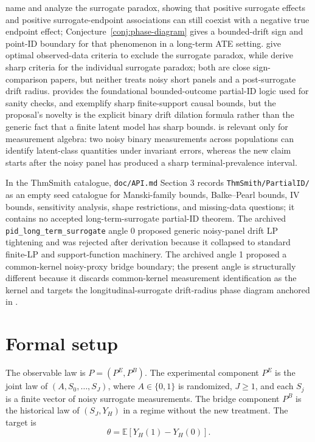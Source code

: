 \documentclass[11pt]{article}
\newcommand{\E}{\mathbb{E}}
\theoremstyle{definition}
\theoremstyle{plain}
\theoremstyle{remark}
\begin{document}
\citet{ChenGengJia2007} name and analyze the surrogate paradox, showing that positive surrogate effects and positive surrogate-endpoint associations can still coexist with a negative true endpoint effect; Conjecture~\ref{conj:phase-diagram} gives a bounded-drift sign and point-ID boundary for that phenomenon in a long-term ATE setting.  \citet{YinLiuGengLuo2020} give optimal observed-data criteria to exclude the surrogate paradox, while \citet{MaYinLiuGeng2021} derive sharp criteria for the individual surrogate paradox; both are close sign-comparison papers, but neither treats noisy short panels and a post-surrogate drift radius.  \citet{Manski1990} provides the foundational bounded-outcome partial-ID logic used for sanity checks, and \citet{BalkePearl1997} exemplify sharp finite-support causal bounds, but the proposal's novelty is the explicit binary drift dilation formula rather than the generic fact that a finite latent model has sharp bounds.  \citet{HuiWalter1980} is relevant only for measurement algebra: two noisy binary measurements across populations can identify latent-class quantities under invariant errors, whereas the new claim starts after the noisy panel has produced a sharp terminal-prevalence interval.

In the ThmSmith catalogue, \texttt{doc/API.md} Section 3 records \texttt{ThmSmith/PartialID/} as an empty seed catalogue for Manski-family bounds, Balke--Pearl bounds, IV bounds, sensitivity analysis, shape restrictions, and missing-data questions; it contains no accepted long-term-surrogate partial-ID theorem.  The archived \texttt{pid\_long\_term\_surrogate} angle 0 proposed generic noisy-panel drift LP tightening and was rejected after derivation because it collapsed to standard finite-LP and support-function machinery.  The archived angle 1 proposed a common-kernel noisy-proxy bridge boundary; the present angle is structurally different because it discards common-kernel measurement identification as the kernel and targets the longitudinal-surrogate drift-radius phase diagram anchored in \citet{HuangWangYuanZhaoZhang2026}.

\section{Formal setup}
The observable law is \(P=(P^E,P^B)\).  The experimental component \(P^E\) is the joint law of \((A,S_0,\ldots,S_J)\), where \(A\in\{0,1\}\) is randomized, \(J\ge1\), and each \(S_j\) is a finite vector of noisy surrogate measurements.  The bridge component \(P^B\) is the historical law of \((S_J,Y_H)\) in a regime without the new treatment.  The target is
\[
  \theta=\E[Y_H(1)-Y_H(0)].
\]
\end{document}
